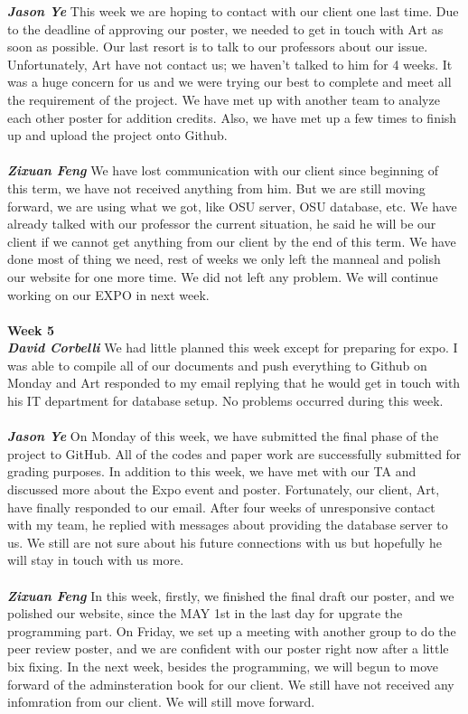 \documentclass[onecolumn, draftclsnofoot,10pt, compsoc]{IEEEtran}
\begin{document}
\textbf{\textit{Jason Ye}}
This week we are hoping to contact with our client one last time. Due to the deadline of approving our poster, we needed to get in touch with Art as soon as possible. Our last resort is to talk to our professors about our issue. Unfortunately, Art have not contact us; we haven't talked to him for 4 weeks. It was a huge concern for us and we were trying our best to complete and meet all the requirement of the project. We have met up with another team to analyze each other poster for addition credits. Also, we have met up a few times to finish up and upload the project onto Github.\\ \\
\textbf{\textit{Zixuan Feng}}
We have lost communication with our client since beginning of this term, we have not received anything from him. But we are still moving forward, we are using what we got, like OSU server, OSU database, etc. We have already talked with our professor the current situation, he said he will be our client if we cannot get anything from our client by the end of this term. We have done most of thing we need, rest of weeks we only left the manneal and polish our website for one more time. We did not left any problem. We will continue working on our EXPO in next week.\\ \\
\textbf{Week 5}
\\ \textbf{\textit{David Corbelli}}
We had little planned this week except for preparing for expo.
I was able to compile all of our documents and push everything to Github on Monday and Art responded to my email replying that he would get in touch with his IT department for database setup.
No problems occurred during this week.\\ \\
\textbf{\textit{Jason Ye}}
On Monday of this week, we have submitted the final phase of the project to GitHub. All of the codes and paper work are successfully submitted for grading purposes. In addition to this week, we have met with our TA and discussed more about the Expo event and poster. Fortunately, our client, Art, have finally responded to our email. After four weeks of unresponsive contact with my team, he replied with messages about providing the database server to us. We still are not sure about his future connections with us but hopefully he will stay in touch with us more.\\ \\
\textbf{\textit{Zixuan Feng}}
In this week, firstly, we finished the final draft our poster, and we polished our website, since the MAY 1st in the last day for upgrate the programming part. On Friday, we set up a meeting with another group to do the peer review poster, and we are confident with our poster right now after a little bix fixing. In the next week, besides the programming, we will begun to move forward of the adminsteration book for our client. We still have not received any infomration from our client. We will still move forward.\\ \\
\end{document}
